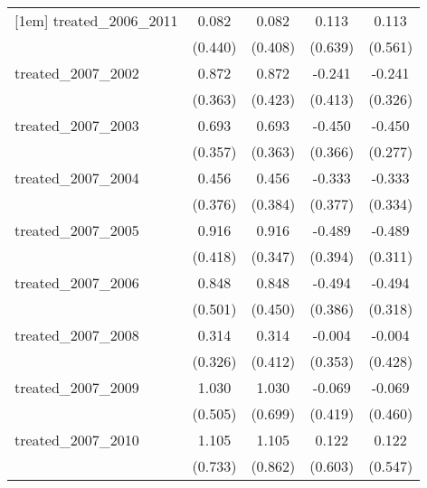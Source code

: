 {\begin{tabular}{l*{4}{c}}
[1em]
treated\_2006\_2011&       0.082         &       0.082         &       0.113         &       0.113         \\
            &     (0.440)         &     (0.408)         &     (0.639)         &     (0.561)         \\
[1em]
treated\_2007\_2002&       0.872\sym{*}  &       0.872\sym{*}  &      -0.241         &      -0.241         \\
            &     (0.363)         &     (0.423)         &     (0.413)         &     (0.326)         \\
[1em]
treated\_2007\_2003&       0.693         &       0.693         &      -0.450         &      -0.450         \\
            &     (0.357)         &     (0.363)         &     (0.366)         &     (0.277)         \\
[1em]
treated\_2007\_2004&       0.456         &       0.456         &      -0.333         &      -0.333         \\
            &     (0.376)         &     (0.384)         &     (0.377)         &     (0.334)         \\
[1em]
treated\_2007\_2005&       0.916\sym{*}  &       0.916\sym{**} &      -0.489         &      -0.489         \\
            &     (0.418)         &     (0.347)         &     (0.394)         &     (0.311)         \\
[1em]
treated\_2007\_2006&       0.848         &       0.848         &      -0.494         &      -0.494         \\
            &     (0.501)         &     (0.450)         &     (0.386)         &     (0.318)         \\
[1em]
treated\_2007\_2008&       0.314         &       0.314         &      -0.004         &      -0.004         \\
            &     (0.326)         &     (0.412)         &     (0.353)         &     (0.428)         \\
[1em]
treated\_2007\_2009&       1.030\sym{*}  &       1.030         &      -0.069         &      -0.069         \\
            &     (0.505)         &     (0.699)         &     (0.419)         &     (0.460)         \\
[1em]
treated\_2007\_2010&       1.105         &       1.105         &       0.122         &       0.122         \\
            &     (0.733)         &     (0.862)         &     (0.603)         &     (0.547)         \\

\end{tabular}}
